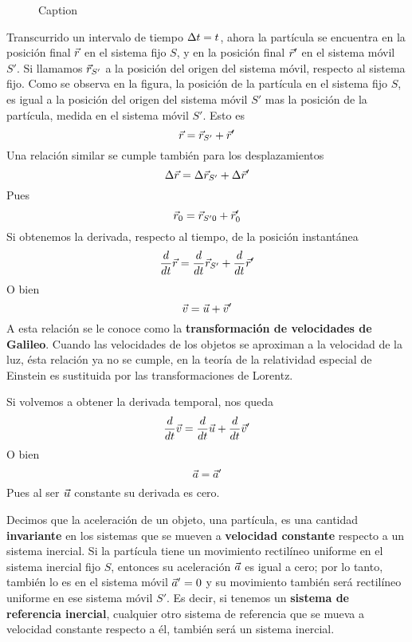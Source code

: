 \begin{figure}
{
    }
    \caption{Caption}
    \label{fig:enter-label}
\end{figure}

Transcurrido un intervalo de tiempo $\Delta t = t$, ahora la partícula se encuentra en la posición final $\vec{r}$ en el sistema fijo $S$, y en la posición final $\vec{r}'$ en el sistema móvil $S'$. Si llamamos $\vec{r}_{S'}$ a la posición del origen del sistema móvil, respecto al sistema fijo. Como se observa en la figura, la posición de la partícula en el sistema fijo $S$, es igual a la posición del origen del sistema móvil $S'$ mas la posición de la partícula, medida en el sistema móvil $S'$. Esto es
$$\vec{r} = \vec{r}_{S'} + \vec{r}'$$
Una relación similar se cumple también para los desplazamientos
$$\Delta\vec{r} = \Delta\vec{r}_{S'} + \Delta\vec{r}'$$
Pues
$$\vec{r}_0 = \vec{r}_{S'0} + \vec{r}_0'$$
Si obtenemos la derivada, respecto al tiempo, de la posición instantánea
$$\frac{d}{dt}\vec{r} = \frac{d}{dt}\vec{r}_{S'} + \frac{d}{dt}\vec{r}'$$
O bien
$$\vec{v} = \vec{u} + \vec{v}'$$
A esta relación se le conoce como la \textbf{transformación de velocidades de Galileo}. Cuando las velocidades de los objetos se aproximan a la velocidad de la luz, ésta relación ya no se cumple, en la teoría de la relatividad especial de Einstein es sustituida por las transformaciones de Lorentz.

Si volvemos a obtener la derivada temporal, nos queda
$$\frac{d}{dt}\vec{v} = \frac{d}{dt}\vec{u} + \frac{d}{dt}\vec{v}'$$
O bien
$$\vec{a} = \vec{a}'$$
Pues al ser $\vec{u}$ constante su derivada es cero.

Decimos que la aceleración de un objeto, una partícula, es una cantidad \textbf{invariante} en los sistemas que se mueven a \textbf{velocidad constante} respecto a un sistema inercial. Si la partícula tiene un movimiento rectilíneo uniforme en el sistema inercial fijo $S$, entonces su aceleración $\vec{a}$ es igual a cero; por lo tanto, también lo es en el sistema móvil $\vec{a}' = 0$ y su movimiento también será rectilíneo uniforme en ese sistema móvil $S'$. Es decir, si tenemos un \textbf{sistema de referencia inercial}, cualquier otro sistema de referencia que se mueva a velocidad constante respecto a él, también será un sistema inercial.

